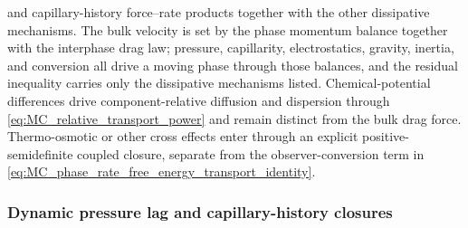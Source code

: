 and capillary-history force--rate products together with the other dissipative
mechanisms.  The bulk velocity is set by the phase momentum balance together
with the interphase drag law; pressure, capillarity, electrostatics, gravity,
inertia, and conversion all drive a moving phase through those balances, and
the residual inequality carries only the dissipative mechanisms listed.
Chemical-potential differences drive component-relative diffusion and
dispersion through \eqref{eq:MC_relative_transport_power} and remain distinct
from the bulk drag force.  Thermo-osmotic or other cross effects enter through
an explicit positive-semidefinite coupled closure, separate from the
observer-conversion term in
\eqref{eq:MC_phase_rate_free_energy_transport_identity}.

\subsubsection{Dynamic pressure lag and capillary-history closures}
\label{sec:MC_capillary_history_closure}

